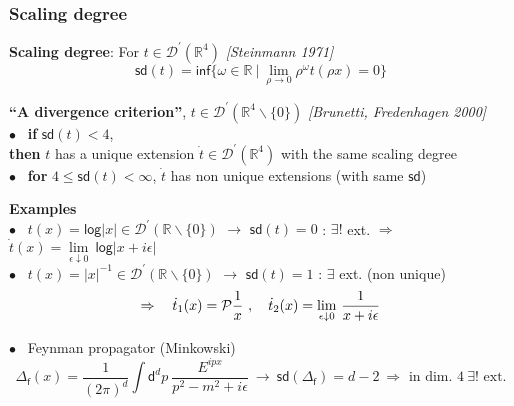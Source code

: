 \documentclass[9pt]{beamer}
\newcommand{\abs}[1]{\left|{#1}\right|}
\renewcommand{\log}{\mathsf{log}}
\renewcommand{\inf}{\mathsf{inf}}
\newcommand{\sd}{\mathsf{sd}}
\newcommand{\citebeam}[1]{\textit{\textcolor{black!60!white}{[#1]}}}
\newcommand{\Dcal}{\mathcal{D}}
\newcommand{\Pcal}{\mathcal{P}}
\newcommand{\Rbb}{\mathbb{R}}
\newcommand{\dsf}{\mathsf{d}}
\newcommand{\fsf}{\mathsf{f}}
\begin{document}

\begin{frame}

\frametitle{Scaling degree}

\vfill

\textbf{Scaling degree}: For $t \in \Dcal^\prime(\Rbb^4)$ \citebeam{Steinmann 1971} 
\\[-15pt]
\begin{equation*}
\sd(t) = \inf \{\omega\in\Rbb \ | \ \lim_{\rho \to 0}\rho^\omega t(\rho x)=0 \} 
\end{equation*}

\vspace*{-8pt}

\begin{block}{}
\vspace*{-10pt}
\textbf{``A divergence criterion''}, $t \in \Dcal^\prime(\Rbb^4\backslash\{0\})$ \quad \citebeam{Brunetti, Fredenhagen 2000} \\
$\bullet$ \ \textbf{if} $\sd(t) < 4$, \\
\hspace*{8pt} \textbf{then} $t$ has a unique extension $\dot{t} \in \Dcal^\prime(\Rbb^4)$ with the same scaling degree \\
$\bullet$ \ \textbf{for} $4 \leq \sd(t) < \infty$, $\dot{t}$ has non unique extensions (with same $\sd$)
\end{block}

\vspace*{-4pt}

\textbf{Examples} \\[2pt]

$\bullet$ \ $t(x) = \log\abs{x} \in \Dcal^\prime(\Rbb\backslash\{0\})$ $\to$ $\sd(t) = 0$ : $\exists!$ ext. $\Rightarrow$ $\dot{t}(x) = \underset{\epsilon \downarrow 0}{\lim} \ \log\abs{x+i\epsilon}$ \\

$\bullet$ \ $t(x) = \abs{x}^{-1} \in \Dcal^\prime(\Rbb\backslash\{0\})$ $\to$ $\sd(t) = 1$ : $\exists$ ext. (non unique) \\
\vspace*{-14pt}
\begin{equation*}
\Rightarrow \quad \dot{t}_1(x) = \Pcal\frac1x \ , \quad \dot{t}_2(x) = \underset{\epsilon \downarrow 0}{\lim} \ \frac{1}{x + i \epsilon}
\vspace*{-2pt}
\end{equation*}

$\bullet$ \ Feynman propagator (Minkowski)
\vspace*{-10pt}
\begin{equation*}
\Delta_\fsf(x) = \frac{1}{(2\pi)^d} \int \dsf^dp \ \frac{E^{ipx}}{p^2-m^2+i\epsilon} \ \to \ \sd(\Delta_\fsf)=d-2 \ \Rightarrow \mbox{ in dim. } 4 \ \exists! \mbox{ ext.} 
\end{equation*}
 
\end{frame}
\end{document}

